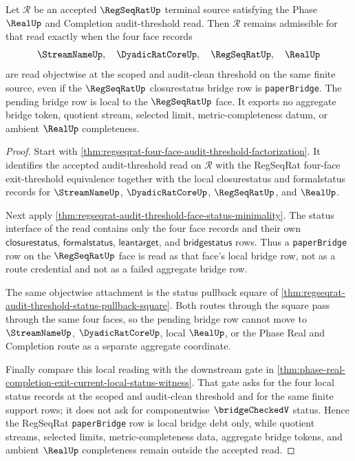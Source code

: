 \begin{theorem}
\label{thm:regseqrat-paperbridge-audit-threshold-locality}
Let $\mathcal R$ be an accepted $\RegSeqRatUp$ terminal source satisfying the
Phase $\RealUp$ and Completion audit-threshold read. Then $\mathcal R$ remains
admissible for that read exactly when the four face records
$$
\StreamNameUp,\quad \DyadicRatCoreUp,\quad \RegSeqRatUp,\quad \RealUp
$$
are read objectwise at the scoped and audit-clean threshold on the same finite
source, even if the $\RegSeqRatUp$ closurestatus bridge row is
\texttt{paperBridge}. The pending bridge row is local to the $\RegSeqRatUp$
face. It exports no aggregate bridge token, quotient stream, selected limit,
metric-completeness datum, or ambient $\RealUp$ completeness.
\end{theorem}
\begin{proof}
Start with \autoref{thm:regseqrat-four-face-audit-threshold-factorization}.
It identifies the accepted audit-threshold read on $\mathcal R$ with the
RegSeqRat four-face exit-threshold equivalence together with the local
closurestatus and formalstatus records for $\StreamNameUp$,
$\DyadicRatCoreUp$, $\RegSeqRatUp$, and $\RealUp$.

Next apply
\autoref{thm:regseqrat-audit-threshold-face-status-minimality}. The status
interface of the read contains only the four face records and their own
$\mathsf{closurestatus}$, $\mathsf{formalstatus}$, $\mathsf{leantarget}$, and
$\mathsf{bridgestatus}$ rows. Thus a \texttt{paperBridge} row on the
$\RegSeqRatUp$ face is read as that face's local bridge row, not as a route
credential and not as a failed aggregate bridge row.

The same objectwise attachment is the status pullback square of
\autoref{thm:regseqrat-audit-threshold-status-pullback-square}. Both routes
through the square pass through the same four faces, so the pending bridge
row cannot move to $\StreamNameUp$, $\DyadicRatCoreUp$, local $\RealUp$, or
the Phase Real and Completion route as a separate aggregate coordinate.

Finally compare this local reading with the downstream gate in
\autoref{thm:phase-real-completion-exit-current-local-status-witness}. That
gate asks for the four local status records at the scoped and audit-clean
threshold and for the same finite support rows; it does not ask for
componentwise $\bridgeCheckedV$ status. Hence the RegSeqRat
\texttt{paperBridge} row is local bridge debt only, while quotient streams,
selected limits, metric-completeness data, aggregate bridge tokens, and
ambient $\RealUp$ completeness remain outside the accepted read.
\end{proof}

